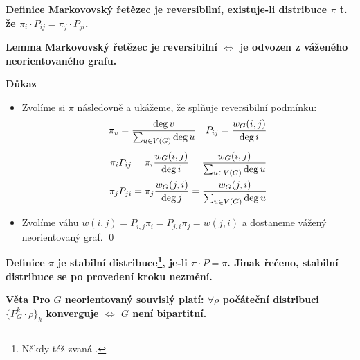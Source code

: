 \documentclass[a4paper,12pt,titlepage]{article}
\newcommand{\lm}{\smallskip\noindent\bf Lemma\rm{} }
\newcommand{\dk}{\smallskip\noindent\bf Důkaz\rm{} }
\newcommand{\df}{\smallskip\noindent\bf Definice\rm{} }
\newcommand{\vt}{\smallskip\noindent\bf Věta\rm{} }
\begin{document}
\df Markovovský řetězec je reversibilní, existuje-li distribuce $\pi$
t. že $\pi_i\cdot P_{ij} = \pi_j\cdot P_{ji}$.

\lm Markovovský řetězec je reversibilní $\Leftrightarrow$ je odvozen z váženého neorientovaného grafu.

\dk 
\begin{itemize}

\item[\uv{$\Leftarrow$}]
Zvolíme si $\pi$ následovně a ukážeme, že splňuje reversibilní podmínku:
\begin{align*}
& \pi_v = {\deg v\over \sum_{u\in V(G)} \deg u} & P_{ij} = {w_G(i,j)\over \deg i} \\ 
\end{align*}
\begin{align*}
\pi_i P_{ij} &= \pi_i {w_G(i,j)\over \deg i} = {w_G(i,j)\over \sum_{u\in V(G)}\deg u} \\
\pi_j P_{ji} &= \pi_j {w_G(j,i)\over \deg j} = {w_G(j,i)\over \sum_{u\in V(G)}\deg u}
\end{align*}

\item[\uv{$\Rightarrow$}]
Zvolíme váhu $w(i,j) = P_{i,j}\pi_i = P_{j,i}\pi_j = w(j,i)$ a dostaneme vážený
neorientovaný graf.
\qed
\end{itemize}

\df $\pi$ je stabilní distribuce\footnote{Někdy též zvaná .},
je-li $\pi\cdot P = \pi$. Jinak řečeno, stabilní distribuce se po provedení
kroku nezmění.

\vt Pro $G$ neorientovaný souvislý platí: $\forall \rho$ počáteční distribuci $\{P_G^k\cdot \rho\}_k$ konverguje $\Leftrightarrow$ $G$ není bipartitní.
\end{document}
